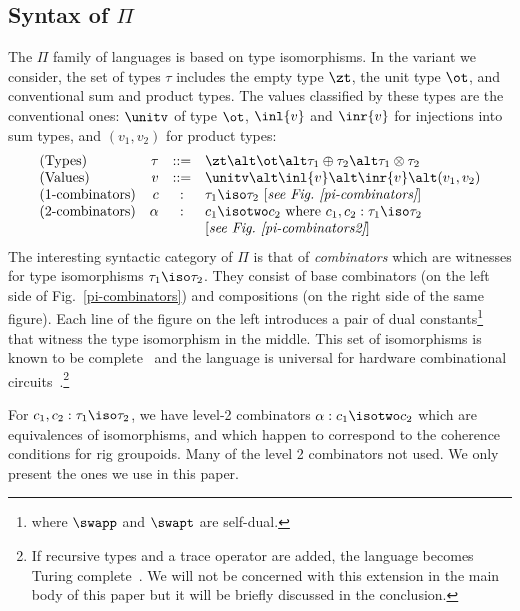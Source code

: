\subsection{Syntax of $\Pi$}
\label{opsempi}

The $\Pi$ family of languages is based on type isomorphisms. In the variant
we consider, the set of types $\tau$ includes the empty type $\zt$, the unit type
$\ot$, and conventional sum and product types. The values classified by these
types are the conventional ones: $\unitv$ of type $\ot$, $\inl{v}$ and $\inr{v}$ for
injections into sum types, and $(v_1,v_2)$ for product types:
\[\begin{array}{lrcl}
(\textrm{Types}) & 
  \tau &::=& \zt \alt \ot \alt \tau_1 \oplus \tau_2 \alt \tau_1 \otimes \tau_2 \\
(\textrm{Values}) & 
  v &::=& \unitv \alt \inl{v} \alt \inr{v} \alt (v_1,v_2) \\
(\textrm{1-combinators}) & 
  c &:& \tau_1 \iso \tau_2 ~ [\textit{see Fig.~\ref{pi-combinators}}] \\
(\textrm{2-combinators}) &
  \alpha &:& c_1 \isotwo c_2 \mbox{~where~} c_1, c_2 : \tau_1 \iso \tau_2 \\
  & && [\textit{see Fig.~\ref{pi-combinators2}}]
\end{array}\]
The interesting syntactic category of $\Pi$ is that of \emph{combinators}
which are witnesses for type isomorphisms $\tau_1 \iso \tau_2$. They consist
of base combinators (on the left side of Fig.~\ref{pi-combinators}) and
compositions (on the right side of the same figure). Each line of the figure
on the left introduces a pair of dual constants\footnote{where $\swapp$ and
$\swapt$ are self-dual.} that witness the type isomorphism in the
middle. This set of isomorphisms is known to be
complete~\cite{Fiore:2004,fiore-remarks} and the language is universal for
hardware combinational
circuits~\cite{James:2012:IE:2103656.2103667}.\footnote{If recursive types
and a trace operator are added, the language becomes Turing
complete~\cite{James:2012:IE:2103656.2103667,rc2011}. We will not be
concerned with this extension in the main body of this paper but it will be
briefly discussed in the conclusion.}

For $c_1, c_2 : \tau_1\iso\tau_2$, we have level-2 combinators $\alpha
: c_1 \isotwo c_2$ which are equivalences of isomorphisms, and which
happen to correspond to the coherence conditions for rig
groupoids. Many of the level 2 combinators not used. We only present
the ones we use in this paper.

